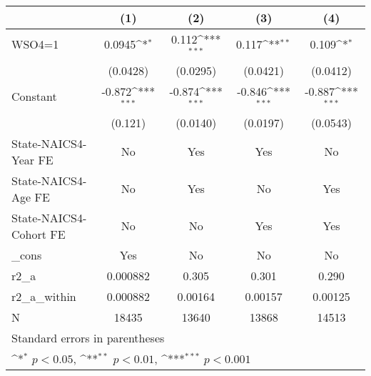 {
\def\sym#1{\ifmmode^{#1}\else\(^{#1}\)\fi}
\begin{tabular}{l*{4}{c}}
\hline\hline
                    &\multicolumn{1}{c}{(1)}         &\multicolumn{1}{c}{(2)}         &\multicolumn{1}{c}{(3)}         &\multicolumn{1}{c}{(4)}         \\
\hline
WSO4=1              &      0.0945\sym{*}  &       0.112\sym{***}&       0.117\sym{**} &       0.109\sym{*}  \\
                    &    (0.0428)         &    (0.0295)         &    (0.0421)         &    (0.0412)         \\
[1em]
Constant            &      -0.872\sym{***}&      -0.874\sym{***}&      -0.846\sym{***}&      -0.887\sym{***}\\
                    &     (0.121)         &    (0.0140)         &    (0.0197)         &    (0.0543)         \\
[1em]
State-NAICS4-Year FE&          No         &         Yes         &         Yes         &          No         \\
[1em]
State-NAICS4-Age FE &          No         &         Yes         &          No         &         Yes         \\
[1em]
State-NAICS4-Cohort FE&          No         &          No         &         Yes         &         Yes         \\
[1em]
\_cons              &         Yes         &          No         &          No         &          No         \\
\hline
r2\_a                &    0.000882         &       0.305         &       0.301         &       0.290         \\
r2\_a\_within         &    0.000882         &     0.00164         &     0.00157         &     0.00125         \\
N                   &       18435         &       13640         &       13868         &       14513         \\
\hline\hline
\multicolumn{5}{l}{\footnotesize Standard errors in parentheses}\\
\multicolumn{5}{l}{\footnotesize \sym{*} \(p<0.05\), \sym{**} \(p<0.01\), \sym{***} \(p<0.001\)}\\
\end{tabular}
}
